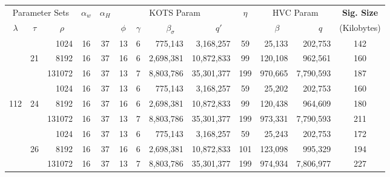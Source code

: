 \begin{table}\centering
  \begin{tabular}{|c|c|r||c|c||c|c|r|r||c||r|r||c|}\hline

    \multicolumn{3}{|c||}{Parameter Sets}  
    & \multirow{2}{*}{$\alpha_w$}  
    & \multirow{2}{*}{$\alpha_H$}   &  \multicolumn{4}{c||}{KOTS Param}  
    & \multirow{2}{*}{$\eta$}       & \multicolumn{2}{c||}{HVC Param}  
    &  {\bf Sig. Size}\\\cline{1-3}\cline{6-9}\cline{11-12}
    
    $\lambda$      & $\tau$
    & $\rho\quad$&   && $\phi$ 
    & $\gamma$                      & $\beta_\sigma\quad$     
    & $q'\quad$                     &        
    & $\beta\quad$                  & $q\quad$ 
    & (Kilobytes) \\\hline\hline


    &       &   1024 &         16 &        37 &         13 &       6 &        775,143 &  3,168,257 &    59 &       25,133 &   202,753 & 142 \\\cline{3-13}
    &    21 &   8192 &         16 &        37 &         16 &       6 &      2,698,381 & 10,872,833 &    99 &      120,108 &   962,561 & 160 \\\cline{3-13}
    &       & 131072 &         16 &        37 &         13 &       7 &      8,803,786 & 35,301,377 &   199 &      970,665 & 7,790,593 & 187 \\\cline{2-13}

    &       &   1024 &         16 &        37 &         13 &       6 &        775,143 &  3,168,257 &    59 &       25,202 &   202,753 & 160 \\\cline{3-13}
112 &    24 &   8192 &         16 &        37 &         16 &       6 &      2,698,381 & 10,872,833 &    99 &      120,438 &   964,609 & 180 \\\cline{3-13}
    &       & 131072 &         16 &        37 &         13 &       7 &      8,803,786 & 35,301,377 &   199 &      973,331 & 7,790,593 & 211 \\\cline{2-13}

    &       &   1024 &         16 &        37 &         13 &       6 &        775,143 &  3,168,257 &    59 &       25,243 &   202,753 & 172 \\\cline{3-13}
    &    26 &   8192 &         16 &        37 &         16 &       6 &      2,698,381 & 10,872,833 &   101 &      123,098 &   995,329 & 194 \\\cline{3-13}
    &       & 131072 &         16 &        37 &         13 &       7 &      8,803,786 & 35,301,377 &   199 &      974,934 & 7,806,977 & 227 \\\hline\hline


\end{tabular}
\end{table}
